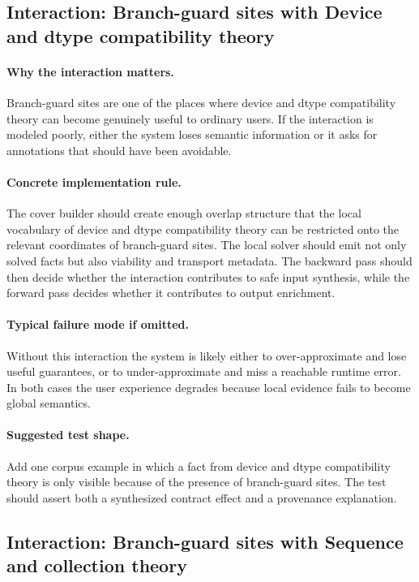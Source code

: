 \documentclass[11pt]{report}
\theoremstyle{definition}
\theoremstyle{plain}
\begin{document}
\subsection{Interaction: Branch-guard sites with Device and dtype compatibility theory}

\paragraph{Why the interaction matters.}
Branch-guard sites are one of the places where device and dtype compatibility theory can become
genuinely useful to ordinary users. If the interaction is modeled poorly,
either the system loses semantic information or it asks for annotations that
should have been avoidable.

\paragraph{Concrete implementation rule.}
The cover builder should create enough overlap structure that the local
vocabulary of device and dtype compatibility theory can be restricted onto the relevant
coordinates of branch-guard sites. The local solver should emit not only
solved facts but also viability and transport metadata. The backward pass
should then decide whether the interaction contributes to safe input
synthesis, while the forward pass decides whether it contributes to output
enrichment.

\paragraph{Typical failure mode if omitted.}
Without this interaction the system is likely either to over-approximate and
lose useful guarantees, or to under-approximate and miss a reachable runtime
error. In both cases the user experience degrades because local evidence
fails to become global semantics.

\paragraph{Suggested test shape.}
Add one corpus example in which a fact from device and dtype compatibility theory is only
visible because of the presence of branch-guard sites. The test should
assert both a synthesized contract effect and a provenance explanation.

\subsection{Interaction: Branch-guard sites with Sequence and collection theory}
\end{document}

